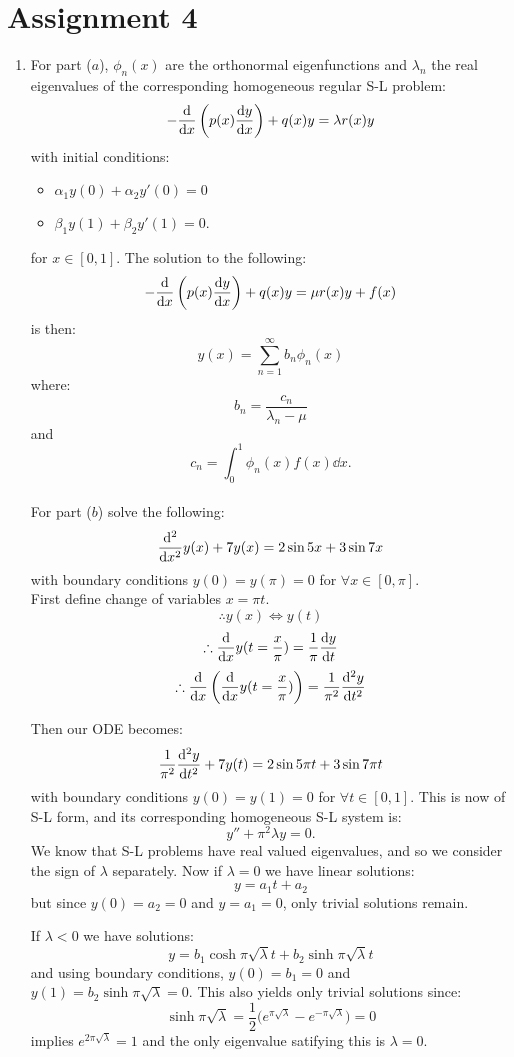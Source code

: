 \pagestyle{fancy}
\fancyhead{}

\section{Assignment 4}
\begin{enumerate}
    \item For part ($a$), $\phi_n(x)$ are the orthonormal
    eigenfunctions and $\lambda_n$ the real eigenvalues of the
    corresponding homogeneous regular S-L problem:
    $$-\dv{x}\left(p(x)\dv{y}{x}\right)+q(x)y=\lambda r(x)y$$
    with initial conditions:
    \begin{itemize}
        \item $\alpha_1 y(0)+\alpha_2 y'(0)=0$
    
        \item $\beta_1 y(1)+\beta_2 y'(1)=0.$
    \end{itemize}
    for $x\in[0,1]$. The solution to the following:
    $$-\dv{x}\left(p(x)\dv{y}{x}\right)+q(x)y=\mu r(x)y+f(x)$$
    is then:
    $$y(x)=\sum_{n=1}^{\infty}b_n\phi_n(x)$$
    where:
    $$b_n=\frac{c_n}{\lambda_n-\mu}$$
    and
    $$c_n=\int_{0}^{1}\phi_n(x)f(x)\dd x.$$ \\

    For part ($b$) solve the following:
    $$\dv[2]{x}y(x)+7y(x)=2\sin 5x+3\sin 7x$$
    with boundary conditions $y(0)=y(\pi)=0$
    for $\forall x\in[0,\pi]$. \\

    First define change of variables $x=\pi t$.
    $$\therefore y(x)\iff y(t)$$
    $$\therefore \dv{x}y(t=\frac{x}{\pi})=\frac{1}{\pi}\dv{y}{t}$$
    $$\therefore \dv{x}\left(\dv{x}y(t=\frac{x}{\pi})\right)
    =\frac{1}{\pi^2}\dv[2]{y}{t}$$

    \newpage

    Then our ODE becomes:
    $$\frac{1}{\pi^2}\dv[2]{y}{t}+7y(t)=2\sin 5\pi t+3\sin 7\pi t$$
    with boundary conditions $y(0)=y(1)=0$
    for $\forall t\in[0,1]$. This is now of S-L form, and its
    corresponding homogeneous S-L system is:
    $$y''+\pi^2\lambda y=0.$$
    We know that S-L problems have real valued eigenvalues, and so
    we consider the sign of $\lambda$ separately.
    Now if $\lambda=0$ we have linear solutions:
    $$y=a_1 t+a_2$$
    but since $y(0)=a_2=0$ and $y=a_1=0$,
    only trivial solutions remain.

    If $\lambda<0$ we have solutions:
    $$y=b_1\cosh\pi\sqrt{\lambda}t
    +b_2\sinh\pi\sqrt{\lambda}t$$
    and using boundary conditions, $y(0)=b_1=0$
    and $y(1)=b_2\sinh\pi\sqrt{\lambda}=0$.
    This also yields only trivial solutions since:
    $$\sinh\pi\sqrt{\lambda}=\frac{1}{2}
    \bigl(e^{\pi\sqrt{\lambda}}
    -e^{-\pi\sqrt{\lambda}}\bigr)=0$$
    implies $e^{2\pi\sqrt{\lambda}}=1$ and the only
    eigenvalue satifying this is $\lambda=0$.


\end{enumerate}
